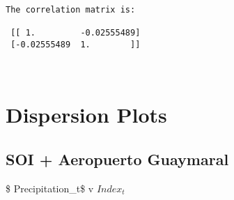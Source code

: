 \documentclass[11pt]{article}
\begin{document}
    \begin{Verbatim}[commandchars=\\\{\}]
The correlation matrix is:

 [[ 1.         -0.02555489]
 [-0.02555489  1.        ]]

    \end{Verbatim}

    \begin{center}
    \end{center}
    { \hspace*{\fill} \\}
    
    \section{Dispersion Plots}\label{dispersion-plots}

    \subsection{SOI + Aeropuerto Guaymaral}\label{soi-aeropuerto-guaymaral}

    \$ Precipitation\_t\$ v \(Index_{t}\)
\end{document}
